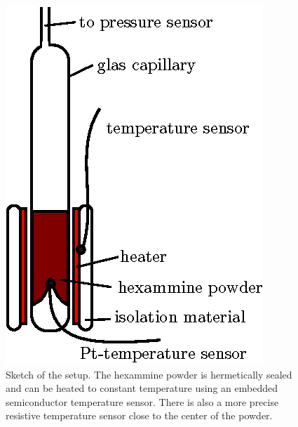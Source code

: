 \documentclass[english,twocolumn,DIV21,a4,10pt]{scrartcl}
\begin{document}
\begin{figure}
  \centering
  \includegraphics{kapillare.eps}
  \caption{Sketch of the setup. The hexammine powder is hermetically
    sealed and can be heated to constant temperature using an embedded
    semiconductor temperature sensor. There is also a more precise
    resistive temperature sensor close to the center of the powder.}
   \label{fig:kapillare}
 \end{figure}
 
\end{document}
